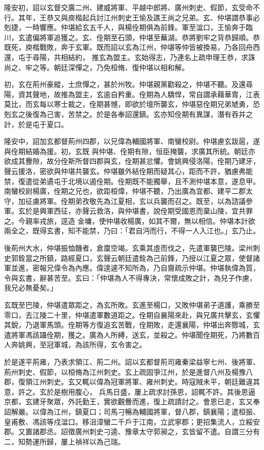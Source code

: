 \begin{pinyinscope}
 隆安初，詔以玄督交廣二州、建威將軍、平越中郎將、廣州刺史、假節，玄受命不行。其年，王恭又與庾楷起兵討江州刺史王愉及譙王尚之兄弟。玄、仲堪謂恭事必剋捷，一時響應。仲堪給玄五千人，與楊佺期俱為前鋒。軍至湓口，王愉奔于臨川，玄遣偏將軍追獲之。玄、佺期至石頭，仲堪至蕪湖。恭將劉牢之背恭歸順。恭既死，庾楷戰敗，奔于玄軍。既而詔以玄為江州，仲堪等仲皆被換易，乃各回舟西還，屯于尋陽，共相結約，
 推玄為盟主。玄始得志，乃連名上疏申理王恭，求誅尚之、牢之等。朝廷深憚之，乃免桓脩、復仲堪以相和解。



 初，玄在荊州豪縱，士庶憚之，甚於州牧。仲堪親黨勸殺之，仲堪不聽。及還尋陽，資其聲地，故推為盟主，玄逾自矜重。佺期為人驕悍，常自謂承藉華胄，江表莫比，而玄每以寒士裁之，佺期甚憾，即欲於壇所襲玄，仲堪惡佺期兄弟虓勇，恐剋玄之後復為己害，苦禁之。於是各奉詔還鎮。玄亦知佺期有異謀，潛有吞并之計，於是屯于夏口。



 隆安中，詔加玄都督荊州四郡，以兄偉為輔國將軍、南蠻校尉。仲堪慮玄跋扈，遂與佺期結婚為援。初，玄既
 與仲堪、佺期有隙，恒臣掩襲，求廣其所統。朝廷亦欲成其釁隙，故分佺斯所督四郡與玄，佺期甚忿懼。會姚興侵洛陽，佺期乃建牙，聲云援洛，密欲與仲堪共襲玄。仲堪雖外結佺期而疑其心，距而不許，猶慮弗能禁，復遣從弟遹屯于北境以遏佺期。佺期既不能獨舉，且不測仲堪本意，遂息甲。南蠻校尉楊廣，佺期之兄也，欲距桓偉，仲堪不聽，乃出廣為宜都、建平二郡太守，加征虜將軍。佺期弟孜敬先為江夏相，玄以兵襲而召之。既至，以為諮議參軍。玄於是興軍西征，亦聲云救洛，與仲堪書，說佺期受國恩而棄山陵，宜共罪之。今親率戎旅，逕造
 金墉，使仲堪收楊廣，如其不爾，無以相信。仲堪本計欲兩全之，既得玄書，知不能禁，乃曰：「君自沔而行，不得一人入江也。」玄乃止。



 後荊州大水，仲堪振恤饑者，倉廩空竭。玄乘其虛而伐之，先遣軍襲巴陵。梁州刺史郭銓當之所鎮，路經夏口，玄聲云朝廷遣銓為己前鋒，乃授以江夏之眾，使督諸軍並進，密報兄偉令為內應。偉遑遽不知所為，乃自齎疏示仲堪。仲堪執偉為質，令與玄書，辭甚苦至。玄曰：「仲堪為人不得專決，常懷成敗之計，為兒子作慮，我兄必無憂矣。」



 玄既至巴陵，仲堪遣眾距之，為玄所敗。玄進至楊口，又敗仲堪弟子道護，乘勝至
 零口，去江陵二十里，仲堪遣軍數道距之。佺期自襄陽來赴，與兄廣共擊玄，玄懼其銳，乃退軍馬頭。佺期等方復追玄苦戰，佺期敗，走還襄陽，仲堪出奔酂城，玄遣將軍馮該躡佺期，獲之。廣為人所縛，送玄，並殺之。仲堪聞佺期死，乃將數百人奔姚興，至冠軍城，為該所得，玄令害之。



 於是遂平荊雍，乃表求領江、荊二州。詔以玄都督荊司雍秦梁益寧七州、後將軍、荊州刺史、假節，以桓脩為江州刺史。玄上疏固爭江州，於是進督八州及楊豫八郡，復領江州刺史。玄又輒以偉為冠軍將軍、雍州刺史。時寇賊未平，朝廷難違其意，許之。玄於是樹用腹心，
 兵馬日盛，屢上疏求討孫恩，詔輒不許。其後恩逼京都，玄建牙聚眾，外託勤王，實欲觀釁而進，復上疏請討之。會恩已走，玄又奉詔解嚴。以偉為江州，鎮夏口；司馬刁暢為輔國將軍，督八郡，鎮襄陽；遣桓振、皇甫敷、馮該等戍湓口。移沮漳蠻二千戶于江南，立武寧郡；更招集流人，立綏安郡。又置諸郡丞。詔徵廣州刺史刁逵、豫章太守郭昶之，玄皆留不遣。自謂三分有二，知勢運所歸，屢上禎祥以為己瑞。




\end{pinyinscope}
